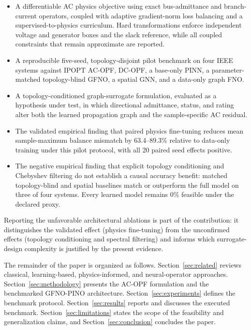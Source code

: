 \documentclass[final,5p,times,twocolumn]{elsarticle}
\begin{document}
\begin{itemize}
  \item A differentiable AC physics objective using exact bus-admittance and
  branch-current operators, coupled with adaptive gradient-norm loss balancing
  and a supervised-to-physics curriculum. Hard transformations enforce
  independent voltage and generator boxes and the slack reference, while all
  coupled constraints that remain approximate are reported.
  \item A reproducible five-seed, topology-disjoint pilot benchmark on four IEEE
  systems against IPOPT AC-OPF, DC-OPF, a base-only PINN, a parameter-matched
  topology-blind GFNO, a spatial GNN, and a data-only graph FNO.
  \item A topology-conditioned graph-surrogate formulation, evaluated as a
  hypothesis under test, in which directional admittance, status, and rating
  alter both the learned propagation graph and the sample-specific AC residual.
  \item The validated empirical finding that paired physics fine-tuning reduces
  mean sample-maximum balance mismatch by 63.4--89.3\% relative to data-only
  training under this pilot protocol, with all 20 paired seed effects positive.
  \item The negative empirical finding that explicit topology conditioning and
  Chebyshev filtering do not establish a causal accuracy benefit: matched
  topology-blind and spatial baselines match or outperform the full model on
  three of four systems. Every learned model remains 0\% feasible under the
  declared proxy.
\end{itemize}

Reporting the unfavorable architectural ablations is part of the contribution:
it distinguishes the validated effect (physics fine-tuning) from the
unconfirmed effects (topology conditioning and spectral filtering) and informs
which surrogate-design complexity is justified by the present evidence.

The remainder of the paper is organized as follows. Section~\ref{sec:related}
reviews classical, learning-based, physics-informed, and neural-operator
approaches. Section~\ref{sec:methodology} presents the AC-OPF formulation and
the benchmarked GFNO-PINO architecture. Section~\ref{sec:experiments} defines the benchmark
protocol. Section~\ref{sec:results} reports and discusses the executed
benchmark.
Section~\ref{sec:limitations} states the scope of the feasibility and
generalization claims, and Section~\ref{sec:conclusion} concludes the paper.
\end{document}
